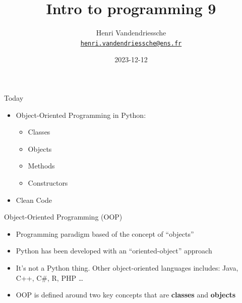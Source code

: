 \documentclass[
  8pt,
  ignorenonframetext,
]{beamer}
\title{Intro to programming 9}
\author{Henri Vandendriessche\\
\href{mailto:henri.vandendriessche@ens.fr}{\nolinkurl{henri.vandendriessche@ens.fr}}}
\date{2023-12-12}
\providecommand{\tightlist}{%
  \setlength{\itemsep}{0pt}\setlength{\parskip}{0pt}}
\begin{document}
\frame{\titlepage}

\begin{frame}{Today}
\protect\hypertarget{today}{}
\begin{itemize}
\tightlist
\item
  Object-Oriented Programming in Python:

  \begin{itemize}
  \tightlist
  \item
    Classes
  \item
    Objects
  \item
    Methods
  \item
    Constructors
  \end{itemize}
\item
  Clean Code
\end{itemize}
\end{frame}

\begin{frame}{Object-Oriented Programming (OOP)}
\protect\hypertarget{object-oriented-programming-oop}{}
\begin{itemize}[<+->]
\tightlist
\item
  Programming paradigm based of the concept of ``objects''
\end{itemize}

\begin{itemize}[<+->]
\tightlist
\item
  Python has been developed with an ``oriented-object'' approach
\end{itemize}

\begin{itemize}[<+->]
\tightlist
\item
  It's not a Python thing. Other object-oriented languages includes:
  Java, C++, C\#, R, PHP \ldots{}
\end{itemize}

\begin{itemize}[<+->]
\tightlist
\item
  OOP is defined around two key concepts that are \textbf{classes} and
  \textbf{objects}
\end{itemize}
\end{frame}
\end{document}
